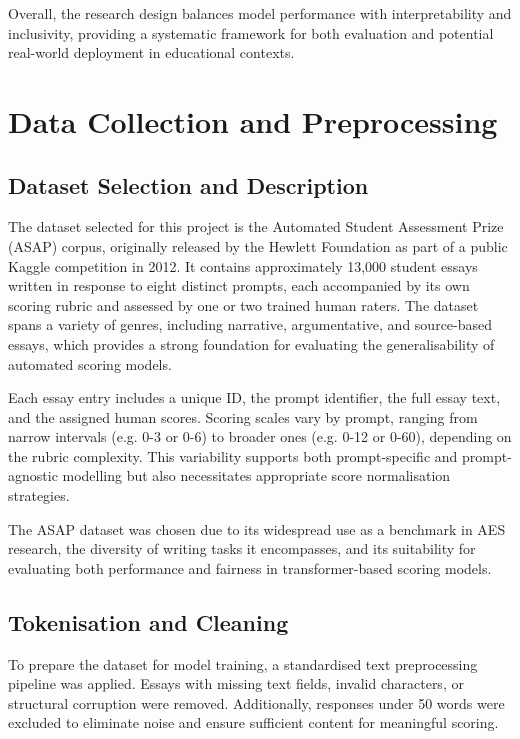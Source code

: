 \documentclass[12pt,a4paper]{report}
\begin{document}
Overall, the research design balances model performance with interpretability and inclusivity, providing a systematic framework for both evaluation and potential real-world deployment in educational contexts.

\section{Data Collection and Preprocessing}

\subsection{Dataset Selection and Description}
The dataset selected for this project is the Automated Student Assessment Prize (ASAP) corpus, originally released by the Hewlett Foundation as part of a public Kaggle competition in 2012. It contains approximately 13,000 student essays written in response to eight distinct prompts, each accompanied by its own scoring rubric and assessed by one or two trained human raters. The dataset spans a variety of genres, including narrative, argumentative, and source-based essays, which provides a strong foundation for evaluating the generalisability of automated scoring models.

Each essay entry includes a unique ID, the prompt identifier, the full essay text, and the assigned human scores. Scoring scales vary by prompt, ranging from narrow intervals (e.g. 0-3 or 0-6) to broader ones (e.g. 0-12 or 0-60), depending on the rubric complexity. This variability supports both prompt-specific and prompt-agnostic modelling but also necessitates appropriate score normalisation strategies.

The ASAP dataset was chosen due to its widespread use as a benchmark in AES research, the diversity of writing tasks it encompasses, and its suitability for evaluating both performance and fairness in transformer-based scoring models.

\subsection{Tokenisation and Cleaning}
To prepare the dataset for model training, a standardised text preprocessing pipeline was applied. Essays with missing text fields, invalid characters, or structural corruption were removed. Additionally, responses under 50 words were excluded to eliminate noise and ensure sufficient content for meaningful scoring.
\end{document}
